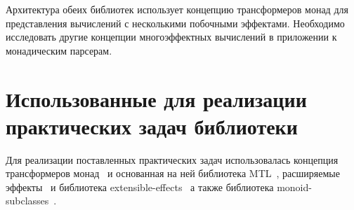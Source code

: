  Архитектура обеих библиотек использует концепцию трансформеров монад для
  представления вычислений с несколькими побочными эффектами. Необходимо
  исследовать другие концепции многоэффектных вычислений в приложении к
  монадическим парсерам.

\section{Использованные для реализации практических задач библиотеки}

Для реализации поставленных практических задач использовалась концепция 
трансформеров монад~\cite{monadTransformers} и основанная на ней библиотека
MTL~\cite{mtlHackage}, расширяемые эффекты~\cite{extEffects} 
и библиотека extensible-effects~\cite{extensibleEffectsHackage} а также библиотека
monoid-subclasses~\cite{monoidSubclassesHackage}.